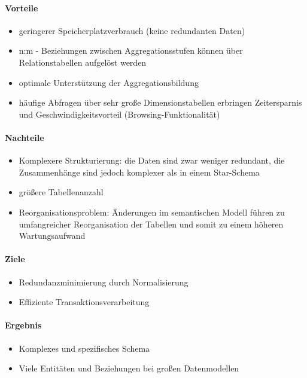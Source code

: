 \paragraph{Vorteile}
\begin{itemize}
    \item geringerer Speicherplatzverbrauch (keine redundanten Daten)
    \item n:m - Beziehungen zwischen Aggregationsstufen können über Relationstabellen aufgelöst werden
    \item optimale Unterstützung der Aggregationsbildung
    \item häufige Abfragen über sehr große Dimensionstabellen erbringen Zeitersparnis und Geschwindigkeitsvorteil (Browsing-Funktionalität)

\end{itemize}

\paragraph{Nachteile}
\begin{itemize}
    \item Komplexere Strukturierung: die Daten sind zwar weniger redundant, die Zusammenhänge sind jedoch komplexer als in einem Star-Schema
    \item größere Tabellenanzahl
    \item Reorganisationsproblem: Änderungen im semantischen Modell führen \newline zu umfangreicher Reorganisation der Tabellen und somit zu einem höheren Wartungsaufwand

\end{itemize}

\paragraph{Ziele}
\begin{itemize}
    \item Redundanzminimierung durch Normalisierung
    \item Effiziente Transaktionsverarbeitung

\end{itemize}

\paragraph{Ergebnis}
\begin{itemize}
    \item Komplexes und spezifisches Schema
    \item Viele Entitäten und Beziehungen bei großen Datenmodellen

\end{itemize}

